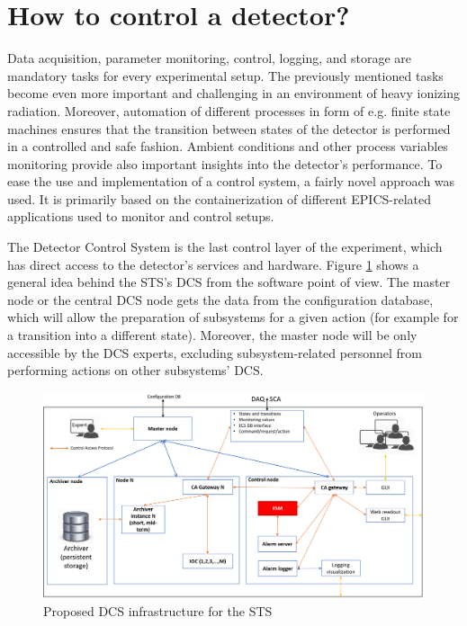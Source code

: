 \section{How to control a detector?}
Data acquisition, parameter monitoring, control, logging, and storage are mandatory tasks for every experimental setup. The previously mentioned tasks become even more important and challenging in an environment of heavy ionizing radiation. Moreover, automation of different processes in form of e.g. finite state machines ensures that the transition between states of the detector is performed in a controlled and safe fashion. Ambient conditions and other process variables monitoring provide also important insights into the detector's performance.  To ease the use and implementation of a control system, a fairly novel approach was used. It is primarily based on the containerization of different \gls{EPICS}-related applications used to monitor and control setups. 

The Detector Control System is the last control layer of the experiment, which has direct access to the detector's services and hardware. Figure \ref{fig_arch} shows a general idea behind the \gls{STS}'s \gls{DCS} from the software point of view.  The master node or the central \gls{DCS} node gets the data from the configuration database, which will allow the preparation of subsystems for a given action (for example for a transition into a different state). Moreover, the master node will be only accessible by the \gls{DCS} experts, excluding subsystem-related personnel from performing actions on other subsystems' \gls{DCS}. 

\begin{figure}[!h]
\centering
\includegraphics[width=0.85\columnwidth]{Chapter3/DCS/images/DCS.png}
\caption{Proposed \gls{DCS} infrastructure for the \gls{STS}}
\label{fig_arch}
\end{figure}
\newpage

